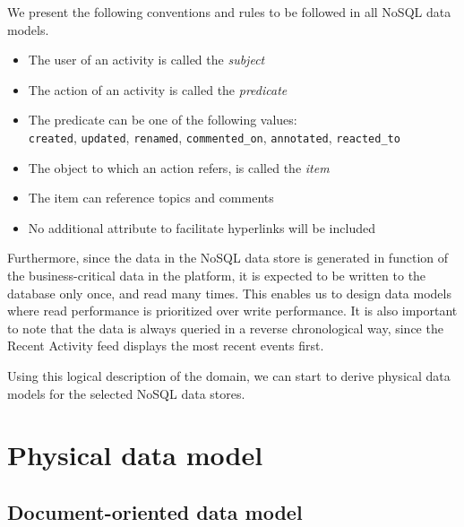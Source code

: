 We present the following conventions and rules to be followed in all NoSQL data models.

\begin{itemize}
  \item The user of an activity is called the \textit{subject}
  \item The action of an activity is called the \textit{predicate}
  \item The predicate can be one of the following values:\\ \texttt{created}, \texttt{updated}, \texttt{renamed}, \texttt{commented\_on}, \texttt{annotated}, \texttt{reacted\_to}
  \item The object to which an action refers, is called the \textit{item}
  \item The item can reference topics and comments
  \item No additional attribute to facilitate hyperlinks will be included
\end{itemize}

Furthermore, since the data in the NoSQL data store is generated in function of the business-critical data in the platform, it is expected to be written to the database only once, and read many times.
This enables us to design data models where read performance is prioritized over write performance.
It is also important to note that the data is always queried in a reverse chronological way, since the Recent Activity feed displays the most recent events first.

Using this logical description of the domain, we can start to derive physical data models for the selected NoSQL data stores.

\section{Physical data model}
\label{sec:physical-data-model}


\subsection{Document-oriented data model}
\label{subsec:document-data-model}



